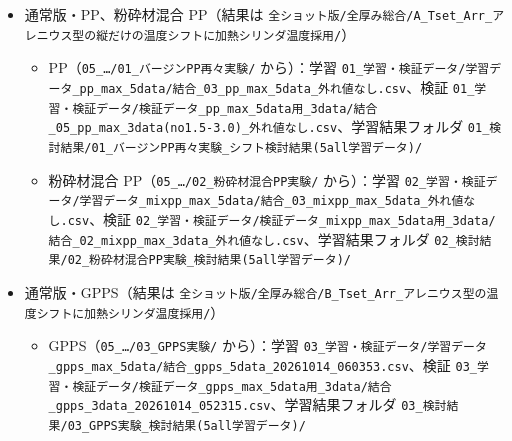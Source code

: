 \documentclass[paper=a4paper,fontsize=10.5pt,line_length=44zw,number_of_lines=40]{jlreq}
\begin{document}
\begin{itemize}[itemsep=0.3ex,topsep=0.4ex]
\item[①] 通常版・PP、粉砕材混合 PP（結果は \texttt{全ショット版/\allowbreak{}全厚み総合/\allowbreak{}A\_\allowbreak{}Tset\_\allowbreak{}Arr\_\allowbreak{}アレニウス型の縦だけの温度シフトに加熱シリンダ温度採用/\allowbreak{}}）
\begin{itemize}[itemsep=0.1ex,topsep=0.2ex]
\item PP（\texttt{05\_\allowbreak{}…/\allowbreak{}01\_\allowbreak{}バージンPP再々実験/\allowbreak{}} から）：学習 \texttt{01\_\allowbreak{}学習・検証データ/\allowbreak{}学習データ\_\allowbreak{}pp\_\allowbreak{}max\_\allowbreak{}5data/\allowbreak{}結合\_\allowbreak{}03\_\allowbreak{}pp\_\allowbreak{}max\_\allowbreak{}5data\_\allowbreak{}外れ値なし.csv}、検証 \texttt{01\_\allowbreak{}学習・検証データ/\allowbreak{}検証データ\_\allowbreak{}pp\_\allowbreak{}max\_\allowbreak{}5data用\_\allowbreak{}3data/\allowbreak{}結合\_\allowbreak{}05\_\allowbreak{}pp\_\allowbreak{}max\_\allowbreak{}3data(no1.5-3.0)\_\allowbreak{}外れ値なし.csv}、学習結果フォルダ \texttt{01\_\allowbreak{}検討結果/\allowbreak{}01\_\allowbreak{}バージンPP再々実験\_\allowbreak{}シフト検討結果(5all学習データ)/\allowbreak{}}
\item 粉砕材混合 PP（\texttt{05\_\allowbreak{}…/\allowbreak{}02\_\allowbreak{}粉砕材混合PP実験/\allowbreak{}} から）：学習 \texttt{02\_\allowbreak{}学習・検証データ/\allowbreak{}学習データ\_\allowbreak{}mixpp\_\allowbreak{}max\_\allowbreak{}5data/\allowbreak{}結合\_\allowbreak{}03\_\allowbreak{}mixpp\_\allowbreak{}max\_\allowbreak{}5data\_\allowbreak{}外れ値なし.csv}、検証 \texttt{02\_\allowbreak{}学習・検証データ/\allowbreak{}検証データ\_\allowbreak{}mixpp\_\allowbreak{}max\_\allowbreak{}5data用\_\allowbreak{}3data/\allowbreak{}結合\_\allowbreak{}02\_\allowbreak{}mixpp\_\allowbreak{}max\_\allowbreak{}3data\_\allowbreak{}外れ値なし.csv}、学習結果フォルダ \texttt{02\_\allowbreak{}検討結果/\allowbreak{}02\_\allowbreak{}粉砕材混合PP実験\_\allowbreak{}検討結果(5all学習データ)/\allowbreak{}}
\end{itemize}
\item[②] 通常版・GPPS（結果は \texttt{全ショット版/\allowbreak{}全厚み総合/\allowbreak{}B\_\allowbreak{}Tset\_\allowbreak{}Arr\_\allowbreak{}アレニウス型の温度シフトに加熱シリンダ温度採用/\allowbreak{}}）
\begin{itemize}[itemsep=0.1ex,topsep=0.2ex]
\item GPPS（\texttt{05\_\allowbreak{}…/\allowbreak{}03\_\allowbreak{}GPPS実験/\allowbreak{}} から）：学習 \texttt{03\_\allowbreak{}学習・検証データ/\allowbreak{}学習データ\_\allowbreak{}gpps\_\allowbreak{}max\_\allowbreak{}5data/\allowbreak{}結合\_\allowbreak{}gpps\_\allowbreak{}5data\_\allowbreak{}20261014\_\allowbreak{}060353.csv}、検証 \texttt{03\_\allowbreak{}学習・検証データ/\allowbreak{}検証データ\_\allowbreak{}gpps\_\allowbreak{}max\_\allowbreak{}5data用\_\allowbreak{}3data/\allowbreak{}結合\_\allowbreak{}gpps\_\allowbreak{}3data\_\allowbreak{}20261014\_\allowbreak{}052315.csv}、学習結果フォルダ \texttt{03\_\allowbreak{}検討結果/\allowbreak{}03\_\allowbreak{}GPPS実験\_\allowbreak{}検討結果(5all学習データ)/\allowbreak{}}

\end{itemize}
\end{itemize}
\end{document}
